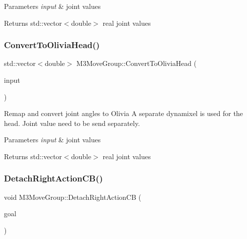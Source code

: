 \begin{DoxyParams}{Parameters}
{\em input} & joint values \\
\hline
\end{DoxyParams}
\begin{DoxyReturn}{Returns}
std\+::vector$<$double$>$ real joint values 
\end{DoxyReturn}
\mbox{\label{classM3MoveGroup_a59d8555d6560673417be20d6bf5d6aae}} 
\subsubsection{\texorpdfstring{Convert\+To\+Olivia\+Head()}{ConvertToOliviaHead()}\hspace{0.1cm}{\footnotesize\ttfamily [2/2]}}
{\footnotesize\ttfamily std\+::vector$<$double$>$ M3\+Move\+Group\+::\+Convert\+To\+Olivia\+Head (\begin{DoxyParamCaption}\item[{const std\+::vector$<$ double $>$}]{input }\end{DoxyParamCaption})\hspace{0.3cm}{\ttfamily [inline]}}



Remap and convert joint angles to Olivia A separate dynamixel is used for the head. Joint value need to be send separately. 


\begin{DoxyParams}{Parameters}
{\em input} & joint values \\
\hline
\end{DoxyParams}
\begin{DoxyReturn}{Returns}
std\+::vector$<$double$>$ real joint values 
\end{DoxyReturn}
\mbox{\label{classM3MoveGroup_a0e43c201d45fd9d987dd5b57f57e6402}} 
\subsubsection{\texorpdfstring{Detach\+Right\+Action\+C\+B()}{DetachRightActionCB()}\hspace{0.1cm}{\footnotesize\ttfamily [1/2]}}
{\footnotesize\ttfamily void M3\+Move\+Group\+::\+Detach\+Right\+Action\+CB (\begin{DoxyParamCaption}\item[{const m3\+\_\+moveit\+::\+Moveit\+Pick\+Place\+Goal\+Const\+Ptr \&}]{goal }\end{DoxyParamCaption})\hspace{0.3cm}{\ttfamily [inline]}}



